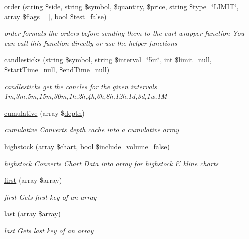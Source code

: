 \begin{DoxyCompactItemize}
\hyperlink{classBinance_1_1API_a40e8ddf7280b33b1899f59d0f16e5fa0}{order} (string \$side, string \$symbol, \$quantity, \$price, string \$type=\char`\"{}L\-I\-M\-I\-T\char`\"{}, array \$flags=\mbox{[}$\,$\mbox{]}, bool \$test=false)
\begin{DoxyCompactList}\small\item\em order formats the orders before sending them to the curl wrapper function You can call this function directly or use the helper functions \end{DoxyCompactList}\item 
\hyperlink{classBinance_1_1API_a8273c4cc5c3226aa46e5aee6a69a58aa}{candlesticks} (string \$symbol, string \$interval=\char`\"{}5m\char`\"{}, int \$limit=null, \$start\-Time=null, \$end\-Time=null)
\begin{DoxyCompactList}\small\item\em candlesticks get the cancles for the given intervals 1m,3m,5m,15m,30m,1h,2h,4h,6h,8h,12h,1d,3d,1w,1\-M \end{DoxyCompactList}\item 
\hyperlink{classBinance_1_1API_a00d93784ab9eb83c3817ccaa75e9746d}{cumulative} (array \$\hyperlink{classBinance_1_1API_ac36901dbea220b2401786a6d1bc4d051}{depth})
\begin{DoxyCompactList}\small\item\em cumulative Converts depth cache into a cumulative array \end{DoxyCompactList}\item 
\hyperlink{classBinance_1_1API_a5eaa9d36db8181fc4605a3841f1106ac}{highstock} (array \$\hyperlink{classBinance_1_1API_a1e0a2985b3ff7e4e9c1155a8e46caa5c}{chart}, bool \$include\-\_\-volume=false)
\begin{DoxyCompactList}\small\item\em highstock Converts Chart Data into array for highstock \& kline charts \end{DoxyCompactList}\item 
\hyperlink{classBinance_1_1API_a53fcf31d85faa8445653f581fdbdb72c}{first} (array \$array)
\begin{DoxyCompactList}\small\item\em first Gets first key of an array \end{DoxyCompactList}\item 
\hyperlink{classBinance_1_1API_a468092e1edfd35f79954236714c825c6}{last} (array \$array)
\begin{DoxyCompactList}\small\item\em last Gets last key of an array \end{DoxyCompactList}\item 

\end{DoxyCompactItemize}
